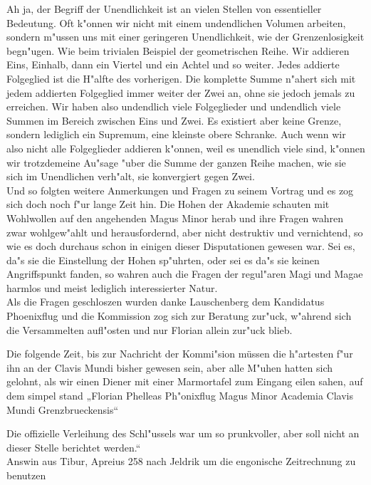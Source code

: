 \documentclass[a5paper,8pt]{book}
\begin{document}
\grqq Ah ja, der Begriff der Unendlichkeit ist an vielen Stellen von essentieller Bedeutung. Oft k"onnen wir nicht mit einem undendlichen Volumen arbeiten, sondern m"ussen 
uns mit einer geringeren Unendlichkeit, wie der Grenzenlosigkeit begn"ugen.
Wie beim trivialen Beispiel der geometrischen Reihe. Wir addieren Eins, Einhalb, dann ein Viertel und ein Achtel und so weiter. Jedes addierte Folgeglied ist die H"alfte des 
vorherigen. Die komplette Summe n"ahert sich mit jedem addierten Folgeglied immer weiter der Zwei an, ohne sie jedoch jemals zu erreichen. Wir haben also undendlich viele 
Folgeglieder und undendlich viele Summen im Bereich zwischen Eins und Zwei. Es existiert aber keine Grenze, sondern lediglich ein Supremum, eine kleinste obere Schranke.
Auch wenn wir also nicht alle Folgeglieder addieren k"onnen, weil es unendlich viele sind, k"onnen wir trotzdemeine Au"sage "uber die Summe der ganzen Reihe machen, wie sie 
sich im Unendlichen verh"alt, sie konvergiert gegen Zwei. \grqq\\

Und so folgten weitere Anmerkungen und Fragen zu seinem Vortrag und es zog sich doch noch f"ur lange Zeit hin. Die Hohen der Akademie schauten mit Wohlwollen auf den 
angehenden Magus Minor herab und ihre Fragen wahren zwar wohlgew"ahlt und herausfordernd, aber nicht destruktiv und vernichtend, so wie es doch durchaus schon in einigen 
dieser Disputationen gewesen war. Sei es, da"s sie die Einstellung der Hohen sp"uhrten, oder sei es da"s sie keinen Angriffspunkt fanden, so wahren auch die Fragen 
der regul"aren Magi und Magae harmlos und meist lediglich interessierter Natur.\\

Als die Fragen geschloszen wurden danke Lauschenberg dem Kandidatus Phoenixflug und die Kommission zog sich zur Beratung zur"uck, w"ahrend sich die Versammelten aufl"osten 
und nur Florian allein zur"uck blieb.\

Die folgende Zeit, bis zur Nachricht der Kommi"sion müssen die h"artesten f"ur ihn an der Clavis Mundi bisher gewesen sein, aber alle M"uhen hatten sich gelohnt, als wir 
einen Diener mit einer Marmortafel zum Eingang eilen sahen, auf dem simpel stand „Florian Phelleas Ph"onixflug Magus Minor Academia Clavis Mundi Grenzbrueckensis“\

Die offizielle Verleihung des Schl"ussels war um so prunkvoller, aber soll nicht an dieser Stelle berichtet werden.“\\

\vspace{10mm}
Answin aus Tibur, Apreius 258 nach Jeldrik um die engonische Zeitrechnung zu benutzen
\end{document}
